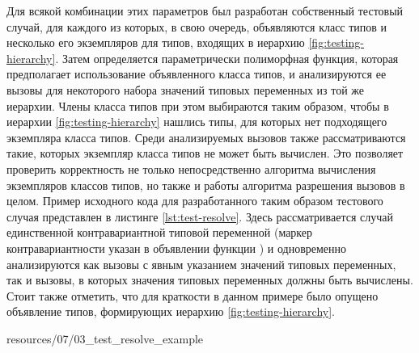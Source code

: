 Для всякой комбинации этих параметров был разработан собственный тестовый случай, для каждого из которых, в свою очередь, объявляются класс типов и несколько его экземпляров для типов, входящих в иерархию \ref{fig:testing-hierarchy}. Затем определяется параметрически полиморфная функция, которая предполагает использование объявленного класса типов, и анализируются ее вызовы для некоторого набора значений типовых переменных из той же иерархии. Члены класса типов при этом выбираются таким образом, чтобы в иерархии \ref{fig:testing-hierarchy} нашлись типы, для которых нет подходящего экземпляра класса типов. Среди анализируемых вызовов также рассматриваются такие, которых экземпляр класса типов не может быть вычислен. Это позволяет проверить корректность не только непосредственно алгоритма вычисления экземпляров классов типов, но также и работы алгоритма разрешения вызовов в целом. Пример исходного кода для разработанного таким образом тестового случая представлен в листинге \ref{lst:test-resolve}. Здесь рассматривается случай единственной контравариантной типовой переменной (маркер контравариантности указан в объявлении функции ) и одновременно анализируются как вызовы с явным указанием значений типовых переменных, так и вызовы, в которых значения типовых переменных должны быть вычислены. Стоит также отметить, что для краткости в данном примере было опущено объявление типов, формирующих иерархию \ref{fig:testing-hierarchy}. 


{resources/07/03_test_resolve_example}  

